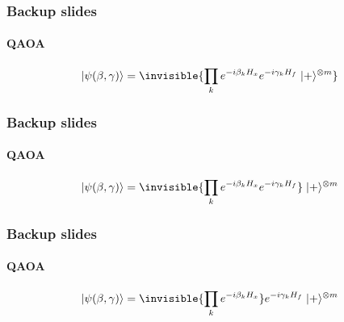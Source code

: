 \documentclass {beamer}
\newcommand {\qvec}[1] {\vert #1 \rangle}
\begin{document}
\begin {frame}
\frametitle {Backup slides}
\framesubtitle {QAOA}

\begin {align*}
\qvec{\psi(\beta, \gamma)} =
\invisible{\prod_{k} e^{-i \beta_k H_x} e^{-i \gamma_k H_f}
\; \qvec{+}^{\otimes m}}
\end {align*}

\centering
\begin {tikzpicture}
\node [scale=0.7]	{
	\begin {quantikz}
	&
	\\
	&
	\\
	&
	\end {quantikz}
};
\end {tikzpicture}
\end {frame}
\begin {frame}
\frametitle {Backup slides}
\framesubtitle {QAOA}

\begin {align*}
\qvec{\psi(\beta, \gamma)} =
\invisible{\prod_{k} e^{-i \beta_k H_x} e^{-i \gamma_k H_f}}
\; \qvec{+}^{\otimes m}
\end {align*}

\centering
{}
\end {frame}

\begin {frame}
\frametitle {Backup slides}
\framesubtitle {QAOA}

\begin {align*}
\qvec{\psi(\beta, \gamma)} =
\invisible{\prod_{k} e^{-i \beta_k H_x}} e^{-i \gamma_k H_f}
\; \qvec{+}^{\otimes m}
\end {align*}

\centering
{}
\end {frame}
\end{document}
